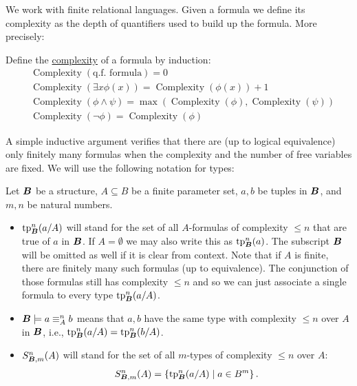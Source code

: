 \documentclass{amsart}
\DeclareMathOperator{\BT}{\boldface B}
\DeclareMathOperator{\cx}{Complexity}
\newcommand{\curly}[1]{\left\{#1\right\}}
\newcommand{\defn}{\underline}
\begin{document}
We work with finite relational languages.
Given a formula we define its complexity as the depth of quantifiers used to build up the formula. More precisely:
\begin{Definition}
  Define the \defn{complexity} of a formula by induction:
  \begin{align*}
    &\cx(\text{q.f. formula}) = 0 \\
    &\cx(\exists x \phi(x)) = \cx(\phi(x)) + 1 \\
    &\cx(\phi \wedge \psi) = \max(\cx(\phi), \cx(\psi)) \\
    &\cx(\neg \phi) = \cx(\phi)
  \end{align*}
\end{Definition}
A simple inductive argument verifies that there are (up to logical equivalence) only finitely many formulas when the complexity and the number of free variables are fixed.
We will use the following notation for types:
\begin{Definition} Let $\BT$ be a structure, $A \subseteq B$ be a finite parameter set, $a,b$ be tuples in $\BT$, and $m, n$ be natural numbers.
  \begin{itemize}
  \item $\tp^n_{\BT}(a/A)$ will stand for the set of all $A$-formulas of complexity $\leq n$ that are true of $a$ in $\BT$.
    If $A = \emptyset$ we may also write this as $\tp^n_{\BT}(a)$.
    The subscript $\BT$ will be omitted as well if it is clear from context.
    Note that if $A$ is finite, there are finitely many such formulas (up to equivalence).
    The conjunction of those formulas still has complexity $\leq n$ and so we can just associate a single formula to every type $\tp^n_{\BT}(a/A)$.
  \item $\BT \models a \equiv^n_A b$ means that $a,b$ have the same type with complexity $\leq n$ over $A$ in $\BT$, i.e., $\tp^n_{\BT}(a/A) = \tp^n_{\BT}(b/A)$.
  \item $S^n_{\BT, m}(A)$ will stand for the set of all $m$-types of complexity $\leq n$ over $A$:
    \begin{align*}
      S^n_{\BT, m}(A) = \curly{\tp^n_{\BT}(a/A) \mid a \in B^m}.
    \end{align*}
  \end{itemize}
\end{Definition}
\end{document}
